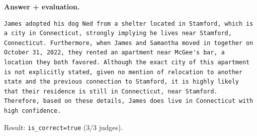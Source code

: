\noindent\textbf{Answer + evaluation.}
{\footnotesize
\begin{Verbatim}[breaklines=true,breakanywhere=true]
James adopted his dog Ned from a shelter located in Stamford, which is a city in Connecticut, strongly implying he lives near Stamford, Connecticut. Furthermore, when James and Samantha moved in together on October 31, 2022, they rented an apartment near McGee's bar, a location they both favored. Although the exact city of this apartment is not explicitly stated, given no mention of relocation to another state and the previous connection to Stamford, it is highly likely that their residence is still in Connecticut, near Stamford. Therefore, based on these details, James does live in Connecticut with high confidence.
\end{Verbatim}
}
\noindent Result: \texttt{is\_correct=true} (3/3 judges).
